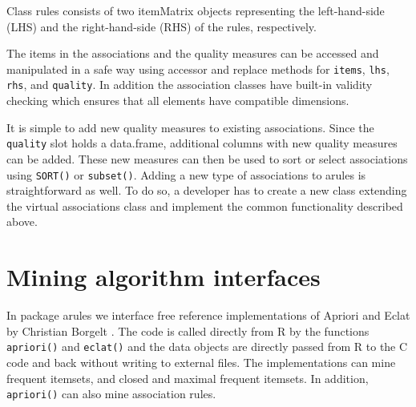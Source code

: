 \documentclass[10pt,a4paper]{article}
\newcommand{\strong}[1]{{\normalfont\fontseries{b}\selectfont #1}}
\newcommand{\class}[1]{\mbox{\textsf{#1}}}
\newcommand{\func}[1]{\mbox{\texttt{#1()}}}
\newcommand{\code}[1]{\mbox{\texttt{#1}}}
\newcommand{\pkg}[1]{\strong{#1}}
\newcommand{\proglang}[1]{\textsf{#1}}
\begin{document}
Class \class{rules} consists of two \class{itemMatrix} objects
representing the left-hand-side (LHS) and the right-hand-side (RHS) of
the rules, respectively.

The items in the associations and the quality measures can be accessed
and manipulated in a safe way using accessor and replace methods for
\code{items}, \code{lhs}, \code{rhs}, and \code{quality}.  In addition
the association classes have built-in validity checking which ensures
that all elements have compatible dimensions.

It is simple to add new quality measures to existing associations.
Since the \code{quality} slot holds a \class{data.frame}, additional
columns with new quality measures can be added. These new measures can
then be used to sort or select associations using \func{SORT} or
\func{subset}.  Adding a new type of associations to \pkg{arules} is
straightforward as well. To do so, a developer has to create a new class
extending the virtual \class{associations} class and implement the
common functionality described above.


\section{Mining algorithm interfaces\label{sec:interfaces}}

In package \pkg{arules} we interface free reference implementations of
Apriori and Eclat by Christian Borgelt
\citep{arules:Borgelt+Kruse:2002,arules:Borgelt:2003}.  The code is
called directly from \proglang{R} by the functions \func{apriori} and
\func{eclat} and the data objects are directly passed from \proglang{R} to
the \proglang{C} code and back without writing to external files.
The implementations can mine frequent itemsets,
and closed and maximal frequent itemsets. 
In addition, \func{apriori} can also mine association rules.  
\end{document}
